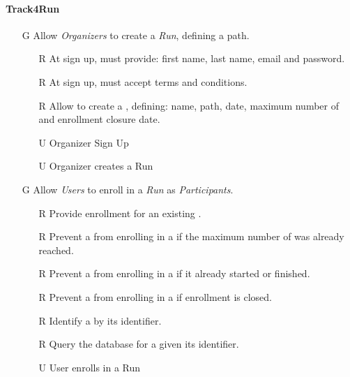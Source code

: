 \documentclass[../../../rasd.tex]{subfiles}
\begin{document}
\paragraph{Track4Run}
\begin{itemize}
    \item[G\subs{8}]Allow \textit{Organizers} to create a \textit{Run}, defining a path.
    \begin{itemize}
        \item[R\subs{39}]At sign up,  must provide: first name, last name, email and password.
        \item[R\subs{40}]At sign up,  must accept terms and conditions.
        \item[R\subs{41}]Allow  to create a , defining: name, path, date, maximum number of  and enrollment closure date. 
        \\
        \item[U\subs{13}]Organizer Sign Up  
        \item[U\subs{14}]Organizer creates a Run
    \end{itemize}

    \item[G\subs{9}]Allow \textit{Users} to enroll in a \textit{Run} as \textit{Participants}. 
    \begin{itemize}
        \item[R\subs{42}]Provide  enrollment for an existing .
        \item[R\subs{43}]Prevent a  from enrolling in a  if the maximum number of  was already reached.
        \item[R\subs{44}]Prevent a  from enrolling in a  if it already started or finished.
        \item[R\subs{45}]Prevent a  from enrolling in a  if enrollment is closed.
        \item[R\subs{47}]Identify a  by its identifier.
        \item[R\subs{48}]Query the database for a  given its identifier.
        \\
        \item[U\subs{15}]User enrolls in a Run
    \end{itemize}


\end{itemize}
\end{document}
